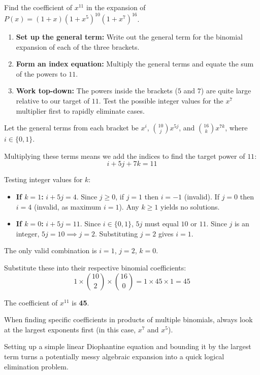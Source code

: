 \begin{problem}
Find the coefficient of $x^{11}$ in the expansion of $P(x) = (1+x)(1+x^5)^{10}(1+x^7)^{16}$.
\end{problem}

\begin{hint}
\begin{enumerate}
    \item \textbf{Set up the general term:} Write out the general term for the binomial expansion of each of the three brackets.
    \item \textbf{Form an index equation:} Multiply the general terms and equate the sum of the powers to $11$.
    \item \textbf{Work top-down:} The powers inside the brackets ($5$ and $7$) are quite large relative to our target of $11$. Test the possible integer values for the $x^7$ multiplier first to rapidly eliminate cases.
\end{enumerate}
\end{hint}

\begin{solution}
Let the general terms from each bracket be $x^i$, $\binom{10}{j}x^{5j}$, and $\binom{16}{k}x^{7k}$, where $i \in \{0, 1\}$.

Multiplying these terms means we add the indices to find the target power of $11$:
\[ i + 5j + 7k = 11 \]

Testing integer values for $k$:
\begin{itemize}
    \item \textbf{If $k = 1$:} $i + 5j = 4$. Since $j \ge 0$, if $j=1$ then $i = -1$ (invalid). If $j=0$ then $i=4$ (invalid, as maximum $i=1$). Any $k \ge 1$ yields no solutions.
    \item \textbf{If $k = 0$:} $i + 5j = 11$. Since $i \in \{0, 1\}$, $5j$ must equal $10$ or $11$. Since $j$ is an integer, $5j = 10 \implies j = 2$. Substituting $j=2$ gives $i = 1$.
\end{itemize}

The only valid combination is $i = 1$, $j = 2$, $k = 0$.

Substitute these into their respective binomial coefficients:
\[ 1 \times \binom{10}{2} \times \binom{16}{0} = 1 \times 45 \times 1 = 45 \]

The coefficient of $x^{11}$ is \textbf{45}.
\end{solution}

\begin{takeaways}
\item When finding specific coefficients in products of multiple binomials, always look at the largest exponents first (in this case, $x^7$ and $x^5$).
\item Setting up a simple linear Diophantine equation and bounding it by the largest term turns a potentially messy algebraic expansion into a quick logical elimination problem.
\end{takeaways}
